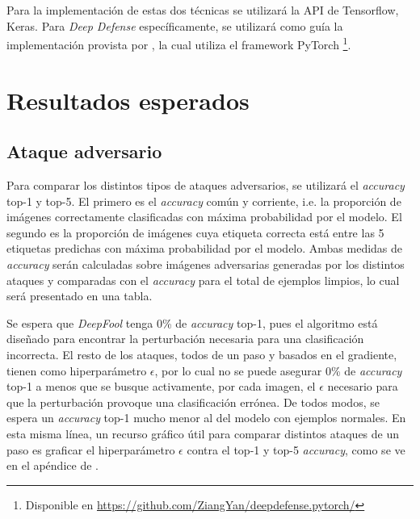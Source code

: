 \documentclass[conference]{IEEEtran}
\begin{document}
Para la implementación de estas dos técnicas se utilizará la API de Tensorflow, Keras. Para \textit{Deep Defense} específicamente, se utilizará como guía la implementación provista por \cite{deepdefense}, la cual utiliza el framework PyTorch \footnote{Disponible en \url{https://github.com/ZiangYan/deepdefense.pytorch/}}. 
\section{Resultados esperados}
\subsection{Ataque adversario}
Para comparar los distintos tipos de ataques adversarios, se utilizará el \textit{accuracy} top-1 y top-5. El primero es el \textit{accuracy} común y corriente, i.e. la proporción de imágenes correctamente clasificadas con máxima probabilidad por el modelo. El segundo es la proporción de imágenes cuya etiqueta correcta está entre las 5 etiquetas predichas con máxima probabilidad por el modelo. Ambas medidas de \textit{accuracy} serán calculadas sobre imágenes adversarias generadas por los distintos ataques y comparadas con el \textit{accuracy} para el total de ejemplos limpios, lo cual será presentado en una tabla. 

Se espera que \textit{DeepFool} tenga 0\% de \textit{accuracy} top-1, pues el algoritmo está diseñado para encontrar la perturbación necesaria para una clasificación incorrecta. El resto de los ataques, todos de un paso y basados en el gradiente, tienen como hiperparámetro $\epsilon$, por lo cual no se puede asegurar 0\% de \textit{accuracy} top-1 a menos que se busque activamente, por cada imagen, el $\epsilon$ necesario para que la perturbación provoque una clasificación errónea. De todos modos, se espera un \textit{accuracy} top-1 mucho menor al del modelo con ejemplos normales. En esta misma línea, un recurso gráfico útil para comparar distintos ataques de un paso es graficar el hiperparámetro $\epsilon$ contra el top-1 y top-5 \textit{accuracy}, como se ve en el apéndice de \cite{kurakin2016}.
\end{document}
